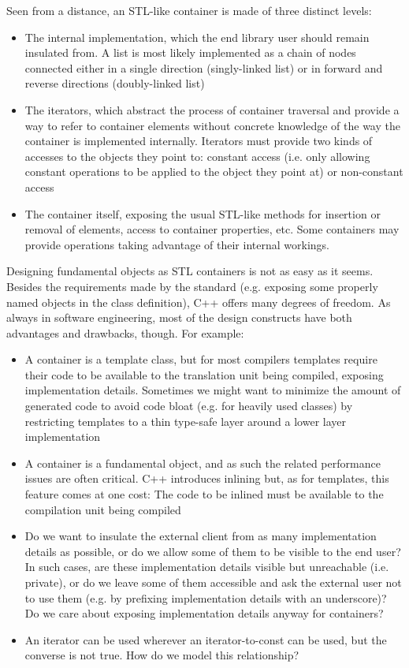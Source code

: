Seen from a distance, an STL-like container is made of three distinct levels:
\begin{itemize}
\item The internal implementation, which the end library user should remain insulated from. A list is most likely implemented as a chain of nodes connected either in a single direction (singly-linked list) or in forward and reverse directions (doubly-linked list)
\item The iterators, which abstract the process of container traversal and provide a way to refer to container elements without concrete knowledge of the way the container is implemented internally. Iterators must provide two kinds of accesses to the objects they point to: constant access (i.e. only allowing constant operations to be applied to the object they point at) or non-constant access
\item The container itself, exposing the usual STL-like methods for insertion or removal of elements, access to container properties, etc. Some containers may provide operations taking advantage of their internal workings.
\end{itemize}

Designing fundamental objects as STL containers is not as easy as it seems. Besides the requirements made by the standard (e.g. exposing some properly named objects in the class definition), C++ offers many degrees of freedom. As always in software engineering, most of the design constructs have  both advantages and drawbacks, though. For example:
\begin{itemize}
\item A container is a template class, but for most compilers templates require their code to be available to the translation unit being compiled, exposing implementation details. Sometimes we might want to minimize the amount of generated code to avoid code bloat (e.g. for heavily used classes) by restricting templates to a thin type-safe layer around a lower layer implementation
\item A container is a fundamental object, and as such the related performance issues are often critical. C++ introduces inlining but, as for templates, this feature comes at one cost: The code to be inlined must be available to the compilation unit being compiled
\item Do we want to insulate the external client from as many implementation details as possible, or do we allow some of them to be visible to the end user? In such cases, are these implementation details visible but unreachable (i.e. private), or do we leave some of them accessible and ask the external user not to use them (e.g. by prefixing implementation details with an underscore)? Do we care about exposing implementation details anyway for containers?
\item An iterator can be used wherever an iterator-to-const can be used, but the converse is not true. How do we model this relationship?
\end{itemize}

